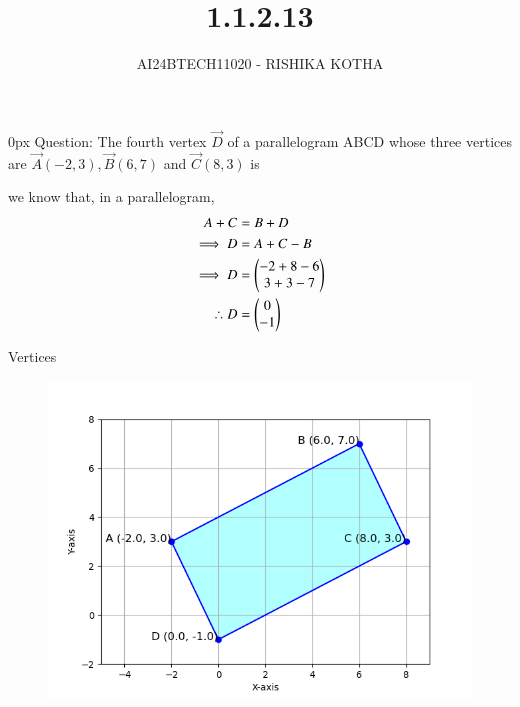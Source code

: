 \documentclass[journal]{IEEEtran}
\begin{document}

\vspace{3cm}

\title{1.1.2.13}
\author{AI24BTECH11020 - RISHIKA KOTHA}
{\let\newpage\relax\maketitle}

\renewcommand{\thefigure}{\theenumi}
\renewcommand{\thetable}{\theenumi}
\setlength{\intextsep}{10pt} %


\renewcommand{\thetable}{\theenumi}
\parindent 0px
Question:
The fourth vertex $\vec{D}$ of a parallelogram ABCD whose three vertices are $\vec{A}(-2, 3),\vec{B}(6, 7)$ and $\vec{C}(8, 3)$ is
\\
\solution

we know that, in a parallelogram,
\begin{align}
	                A+C&=B+D\\
	\implies	D&=A+C-B\\
	\implies        D&=\begin{pmatrix}-2+8-6\\3+3-7\end{pmatrix}\\
	\therefore	D&=\begin{pmatrix}0\\-1\end{pmatrix}
\end{align}
\begin{table}[h!]    
  \centering
  
  \caption{Vertices}
  \label{tab1.2.13.1}
\end{table}

\begin{figure}[h!]
   \centering
   \includegraphics[width=0.7\columnwidth]{fig/Figure_1.png}
   \label{parallelogram graph}
\end{figure}

 
\end{document}
